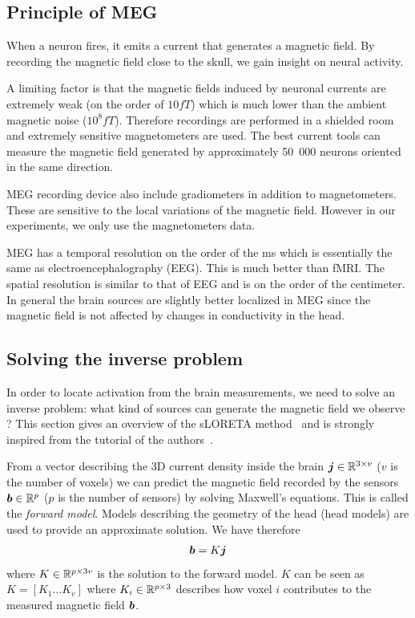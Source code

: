 \subsection{Principle of MEG}
When a neuron fires, it emits a current that generates a magnetic field. By
recording the magnetic field close to the skull, we gain insight on neural
activity.

A limiting factor is that the magnetic fields induced by neuronal currents are
extremely weak (on the order of $10 fT$) which is much lower than the ambient magnetic noise ($10^8 fT$). Therefore recordings are performed in a shielded room and extremely sensitive magnetometers are used.
The best current tools can measure the magnetic field generated by approximately 50~000 neurons oriented in the same direction.

MEG recording device also include gradiometers in addition to magnetometers.
These are sensitive to the local variations of the magnetic field. However in our experiments, we only use the magnetometers data.

MEG has a temporal resolution on the order of the ms which is essentially the same as electroencephalography (EEG). This is much better than fMRI. The spatial
resolution is similar to that of EEG and is on the order of the centimeter.
In general the brain sources are slightly better localized in MEG since the
magnetic field is not affected by changes in conductivity in the head.


\subsection{Solving the inverse problem}
In order to locate activation from the brain measurements, we need to solve an inverse problem: what kind of sources can generate the magnetic field we
observe ? This section gives an overview of the sLORETA
method~\cite{pascual2002standardized} and is strongly inspired from the tutorial
of the authors~\cite{pascual2007discrete}.

From a vector describing the 3D current density inside the brain $\boldsymbol{j} \in \mathbb{R}^{3 \times v}$
($v$ is the number of voxels) we
can predict the magnetic field recorded by the sensors $\boldsymbol{b} \in \mathbb{R}^p$ ($p$ is
the number of sensors) by solving Maxwell's
equations. This is called the \emph{forward model}. Models describing the
geometry of the head (head models) are used to provide an approximate solution.
We have therefore
\begin{align}
  \boldsymbol{b} = K \boldsymbol{j}
  \label{eq:maxwell}
\end{align}
where $K \in \mathbb{R}^{p \times 3v}$ is the solution to the forward model.
$K$ can be seen as $K  = [K_1 \dots K_{v}]$ where $K_i \in \mathbb{R}^{p \times 3}$ describes how voxel $i$ contributes to the measured magnetic field $\boldsymbol{b}$.

